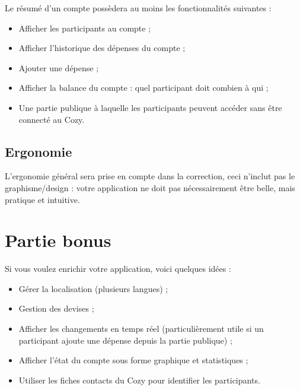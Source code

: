 \documentclass{42-fr}
\begin{document}
        Le r\'esum\'e d'un compte poss\`edera au moins les fonctionnalit\'es suivantes :\\

        \begin{itemize}\itemsep1pt
            \item Afficher les participants au compte ;
            \item Afficher l'historique des d\'epenses du compte ;
			\item Ajouter une d\'epense ;
			\item Afficher la balance du compte : quel participant doit combien \`a qui ;
	        \item Une partie publique \`a laquelle les participants peuvent acc\'eder sans
				\^etre connect\'e au Cozy.
        \end{itemize}


    \section{Ergonomie}

        L'ergonomie g\'en\'eral sera prise en compte dans la correction,
		ceci n'inclut pas le graphisme/design : votre application ne doit
		pas n\'ecessairement \^etre belle, mais pratique et intuitive.




\chapter{Partie bonus}

    Si vous voulez enrichir votre application, voici quelques id\'ees :\newline

    \begin{itemize}\itemsep1pt
		\item G\'erer la localisation (plusieurs langues) ;
        \item Gestion des devises ;
		\item Afficher les changements en temps r\'eel (particuli\`erement utile si
			un participant ajoute une d\'epense depuis la partie publique) ;
		\item Afficher l'\'etat du compte sous forme graphique et statistiques ;
		\item Utiliser les fiches contacts du Cozy pour identifier les participants.
    \end{itemize}
\end{document}
